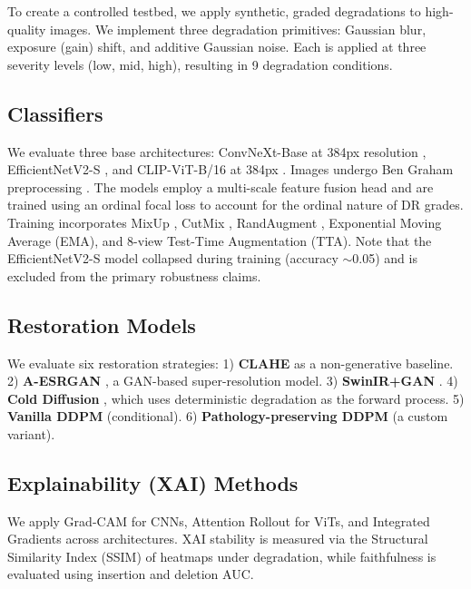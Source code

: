 \documentclass[runningheads]{llncs}
\begin{document}
To create a controlled testbed, we apply synthetic, graded degradations to high-quality images. We implement three degradation primitives: Gaussian blur, exposure (gain) shift, and additive Gaussian noise. Each is applied at three severity levels (low, mid, high), resulting in 9 degradation conditions.

\subsection{Classifiers}
We evaluate three base architectures: ConvNeXt-Base at 384px resolution \cite{liu2022convnext}, EfficientNetV2-S \cite{tan2021efficientnetv2}, and CLIP-ViT-B/16 at 384px \cite{radford2021clip}. Images undergo Ben Graham preprocessing \cite{graham2015kaggle}. The models employ a multi-scale feature fusion head and are trained using an ordinal focal loss \cite{lin2017focal} to account for the ordinal nature of DR grades. Training incorporates MixUp \cite{zhang2018mixup}, CutMix \cite{yun2019cutmix}, RandAugment \cite{cubuk2020randaugment}, Exponential Moving Average (EMA), and 8-view Test-Time Augmentation (TTA). Note that the EfficientNetV2-S model collapsed during training (accuracy $\sim$0.05) and is excluded from the primary robustness claims.

\subsection{Restoration Models}
We evaluate six restoration strategies:
1) \textbf{CLAHE} \cite{pizer1987clahe} as a non-generative baseline.
2) \textbf{A-ESRGAN} \cite{wei2021aesrgan}, a GAN-based super-resolution model.
3) \textbf{SwinIR+GAN} \cite{liang2021swinir}.
4) \textbf{Cold Diffusion} \cite{bansal2022colddiffusion}, which uses deterministic degradation as the forward process.
5) \textbf{Vanilla DDPM} \cite{ho2020ddpm} (conditional).
6) \textbf{Pathology-preserving DDPM} (a custom variant).

\subsection{Explainability (XAI) Methods}
We apply Grad-CAM \cite{selvaraju2017gradcam} for CNNs, Attention Rollout \cite{abnar2020rollout} for ViTs, and Integrated Gradients \cite{sundararajan2017ig} across architectures. XAI stability is measured via the Structural Similarity Index (SSIM) of heatmaps under degradation, while faithfulness is evaluated using insertion and deletion AUC.
\end{document}
